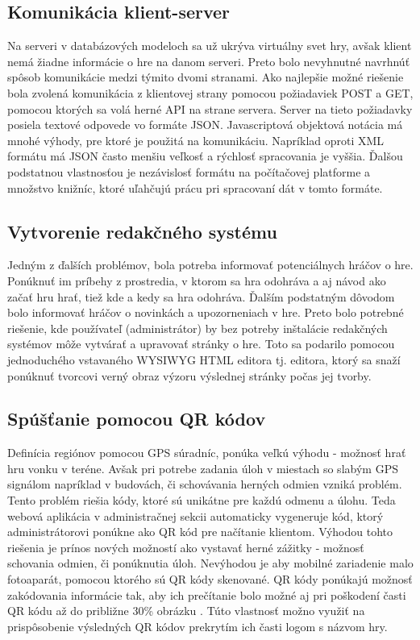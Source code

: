 \subsection{Komunikácia klient-server}
Na serveri v databázových modeloch sa už ukrýva virtuálny svet hry, avšak klient nemá žiadne informácie o hre na danom serveri. Preto bolo nevyhnutné navrhnúť spôsob komunikácie medzi týmito dvomi stranami. Ako najlepšie možné riešenie bola zvolená komunikácia z klientovej strany pomocou požiadaviek POST a GET, pomocou ktorých sa volá herné API na strane servera. Server na tieto požiadavky posiela textové odpovede vo formáte JSON. Javascriptová objektová notácia má mnohé výhody, pre ktoré je použitá na komunikáciu. Napríklad oproti XML formátu má JSON často menšiu veľkosť a rýchlosť spracovania je vyššia. \cite{jsonVsXml} Ďalšou podstatnou vlastnosťou je nezávislosť formátu na počítačovej platforme a množstvo knižníc, ktoré uľahčujú prácu pri spracovaní dát v tomto formáte.

\subsection{Vytvorenie redakčného systému}
Jedným z ďalších problémov, bola potreba informovať potenciálnych hráčov o hre. Ponúknuť im príbehy z prostredia, v ktorom sa hra odohráva a aj návod ako začať hru hrať, tiež kde a kedy sa hra odohráva. Ďalším podstatným dôvodom bolo informovať hráčov o novinkách a upozorneniach v hre. Preto bolo potrebné riešenie, kde používateľ (administrátor) by bez potreby inštalácie redakčných systémov môže vytvárať a upravovať stránky o hre. Toto sa podarilo pomocou jednoduchého vstavaného WYSIWYG HTML editora  tj. editora, ktorý sa snaží ponúknuť tvorcovi verný obraz výzoru výslednej stránky počas jej tvorby.

\subsection{Spúšťanie pomocou QR kódov}

Definícia regiónov pomocou GPS súradníc, ponúka veľkú výhodu - možnosť hrať hru vonku v teréne. Avšak pri potrebe zadania úloh v miestach so slabým GPS signálom napríklad v budovách, či schovávania herných odmien vzniká problém. Tento problém riešia kódy, ktoré sú unikátne pre každú odmenu a úlohu. Teda webová aplikácia v administračnej sekcii automaticky vygeneruje kód, ktorý administrátorovi ponúkne ako QR kód pre načítanie klientom. Výhodou tohto riešenia je prínos nových možností ako vystavať herné zážitky - možnosť schovania odmien, či ponúknutia úloh. Nevýhodou je aby mobilné zariadenie malo fotoaparát, pomocou ktorého sú QR kódy skenované. QR kódy ponúkajú možnosť zakódovania informácie tak, aby ich prečítanie bolo možné aj pri poškodení časti QR kódu až do približne 30\% obrázku \cite{qr-error}. Túto vlastnosť možno využiť na prispôsobenie výsledných QR kódov prekrytím ich časti logom s názvom hry.

